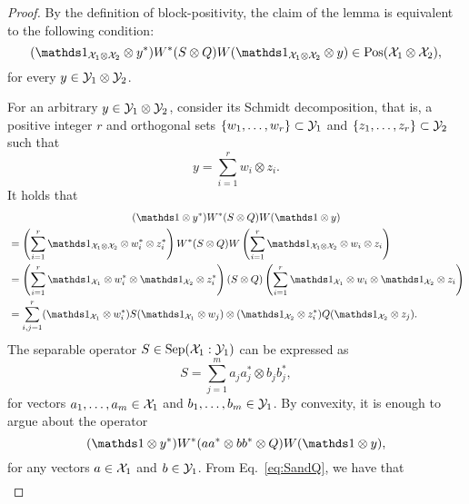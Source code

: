 \begin{proof}
By the definition of block-positivity, the claim of the lemma is equivalent 
to the following condition:
\begin{equation}
  (\I_{\X_{1}\otimes\X_{2}} \otimes y^{\ast})W^{\ast}(S \otimes Q)W
    (\I_{\X_{1}\otimes\X_{2}} \otimes y) \in \Pos(\X_{1}\otimes\X_{2}),
\end{equation}
for every $y \in \mathcal{Y}_{1}\otimes\mathcal{Y}_{2}$.

For an arbitrary $y \in \mathcal{Y}_{1}\otimes\mathcal{Y}_{2}$, consider its Schmidt decomposition,
that is, a positive integer $r$ and orthogonal sets 
$\{w_{1}, \ldots, w_{r}\} \subset \mathcal{Y}_{1}$ and $\{z_{1}, \ldots, z_{r}\} \subset \mathcal{Y}_{2}$ 
such that
  \begin{equation}
    y = \sum_{i = 1}^{r}w_{i} \otimes z_{i}.
  \end{equation}
It holds that
\begin{multline}
\label{eq:SandQ}
    (\I\otimes y^{\ast})W^{\ast}(S \otimes Q)W(\I\otimes y)\\
    \begin{aligned}
    &=\left(\sum_{i=1}^{r}\I_{\X_{1}\otimes\X_{2}}\otimes w_{i}^{\ast}\otimes z_{i}^{\ast}\right)
      W^{\ast}(S \otimes Q)W
      \left(\sum_{i=1}^{r}\I_{\X_{1}\otimes\X_{2}}\otimes w_{i}\otimes z_{i}\right) \\
    &=\left(\sum_{i=1}^{r}\I_{\X_{1}}\otimes w_{i}^{\ast}\otimes\I_{\X_{2}} \otimes z_{i}^{\ast}\right)
    (S \otimes Q)
    \left(\sum_{i=1}^{r}\I_{\X_{1}}\otimes w_{i}\otimes\I_{\X_{2}} \otimes z_{i}\right) \\
    &= \sum_{i,j=1}^{r}(\I_{\X_{1}}\otimes w_{i}^{\ast})S(\I_{\X_{1}}\otimes w_{j})\otimes(\I_{\X_{2}} \otimes z_{i}^{\ast})Q(\I_{\X_{2}} \otimes z_{j}).
    \end{aligned}
\end{multline}
The separable operator $S \in \mathrm{Sep}(\mathcal{X}_{1}:\mathcal{Y}_{1})$ can be expressed as
\begin{equation}
  S = \sum_{j = 1}^{m}a_{j}a_{j}^{\ast}\otimes b_{j}b_{j}^{\ast},
\end{equation}
for vectors $a_{1}, \ldots, a_{m} \in \mathcal{X}_{1}$ and $b_{1}, \ldots, b_{m} \in \mathcal{Y}_{1}$.
By convexity, it is enough to argue about the operator
\begin{equation}
  (\I\otimes y^{\ast})W^{\ast}(aa^{\ast}\otimes bb^{\ast} \otimes Q)W(\I\otimes y), 
\end{equation}
for any vectors $a \in \mathcal{X}_{1}$ and $b \in \mathcal{Y}_{1}$. 
From Eq.~\eqref{eq:SandQ}, we have that 
\begin{multline}

\end{multline}
\end{proof}
